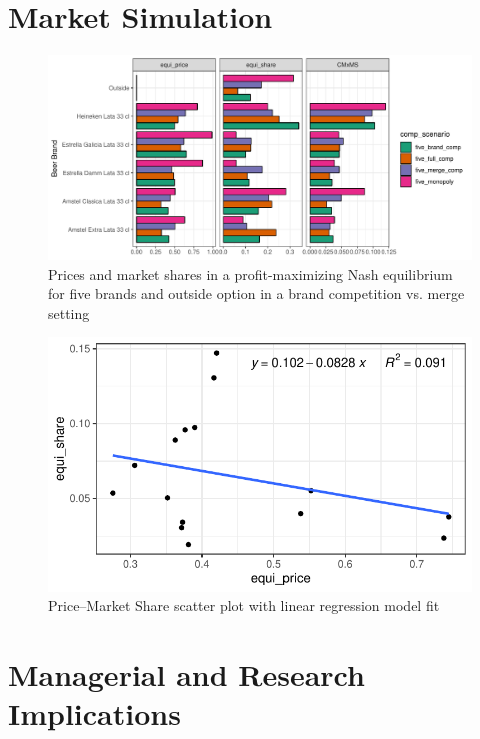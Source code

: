 \documentclass[12pt,a4paper]{article}
\begin{document}
\section{Market Simulation} \label{sec_marketsim}

\begin{figure}[ht]
	\centering
  \includegraphics[scale = 0.7]{figures/bar_price_share_brand_merge_5.pdf}
	\caption{Prices and market shares in a profit-maximizing Nash equilibrium for five brands and outside option in a brand competition vs. merge setting}
	\label{fig_bar_five}
\end{figure}

\begin{figure}[ht]
	\centering
  \includegraphics[scale = 0.7]{figures/scatter_price_share_brand_comp_fitted.pdf}
	\caption{Price--Market Share scatter plot with linear regression model fit}
	\label{fig_scatter_brand_comp}
\end{figure}

\section{Managerial and Research Implications}
\end{document}
